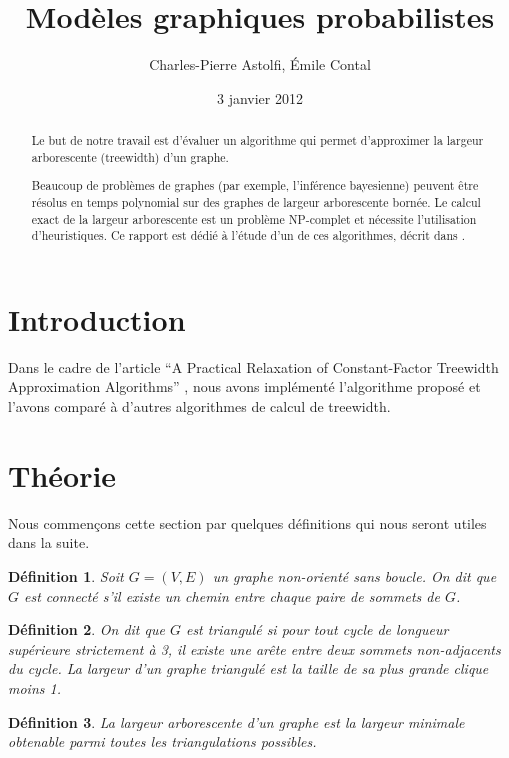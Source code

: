 \documentclass{article}
\title{Modèles graphiques probabilistes}
\author{Charles-Pierre Astolfi, Émile Contal}
\date{3 janvier 2012}
\begin{document}
\newtheorem*{mdef}{Définition}
\newtheorem*{mthm}{Théorème}

\maketitle

\begin{abstract}
Le but de notre travail est d'évaluer un algorithme qui permet
d'approximer la largeur arborescente (treewidth) d'un graphe.

Beaucoup de problèmes de graphes (par exemple, l'inférence bayesienne)
peuvent être résolus en temps polynomial sur des graphes de largeur
arborescente bornée. Le calcul exact de la largeur arborescente est un
problème NP-complet et nécessite l'utilisation d'heuristiques. Ce
rapport est dédié à l'étude d'un de ces algorithmes, décrit dans
\cite{rootpaper}.

\end{abstract}

\section{Introduction}
Dans le cadre de l'article ``A Practical Relaxation of Constant-Factor
Treewidth Approximation Algorithms'' \cite{rootpaper}, nous avons
implémenté l'algorithme proposé et l'avons comparé à d'autres
algorithmes de calcul de treewidth.


\section{Théorie}

Nous commençons cette section par quelques définitions qui nous seront
utiles dans la suite.

\begin{mdef}
Soit $G = (V,E)$ un graphe non-orienté sans boucle. On dit que $G$ est
connecté s'il existe un chemin entre chaque paire de sommets de $G$.
\end{mdef}

\begin{mdef}
On dit que $G$ est triangulé si pour tout cycle de longueur supérieure
strictement à 3, il existe une arête entre deux sommets non-adjacents
du cycle. La largeur d'un graphe triangulé est la taille de sa plus
grande clique moins 1.
\end{mdef}

\begin{mdef}
La largeur arborescente d'un graphe est la largeur minimale obtenable
parmi toutes les triangulations possibles.
\end{mdef}
\end{document}
